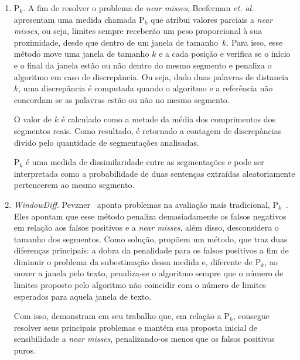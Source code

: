 \begin{enumerate}

	\item P$_k$. A fim de resolver o problema de \textit{near misses}, Beeferman \textit{et. al.}~\cite{Beeferman1999} apresentam uma medida chamada P$_k$ que atribui 
%
valores parciais a \textit{near misses}, 
%
ou seja, limites sempre receberão um peso proporcional à sua proximidade, desde que dentro de um janela de tamanho~$k$.
%
Para isso, esse método move uma janela de tamanho $k$ e a cada posição e verifica se o início e o final da janela estão ou não dentro do mesmo segmento e penaliza o algoritmo em caso de discrepância. Ou seja, dado duas palavras de distancia $k$, uma discrepância é computada quando o algoritmo e a referência não concordam se as palavras estão ou não no mesmo segmento.

O valor de $k$ é calculado como a metade da média dos comprimentos dos segmentos reais. Como resultado, é retornado a contagem de discrepâncias divido pelo quantidade de segmentações analisadas. 

P$_k$ é uma medida de dissimilaridade entre as segmentações e pode ser interpretada como a probabilidade de duas sentenças extraídas aleatoriamente pertencerem ao mesmo segmento.

\item \textit{WindowDiff}. Pevzner~\cite{Pevzner2002} aponta problemas na avaliação mais tradicional, P$_k$~\cite{Beeferman1999}. Eles apontam que esse método penaliza demasiadamente os falsos negativos em relação aos falsos positivos e a \textit{near misses}, além disso, desconsidera o tamanho dos segmentos. Como solução, propõem um método, que traz duas diferenças principais: a dobra da penalidade para os falsos positivos a fim de diminuir o problema da subestimação dessa medida e, diferente de P$_k$, ao mover a janela pelo texto, penaliza-se o algoritmo sempre que o número de limites proposto pelo algoritmo não coincidir com o número de limites esperados para aquela janela de texto. 

Com isso, demonstram em seu trabalho que, em relação a P$_k$, consegue resolver seus principais problemas e mantém sua proposta inicial de sensibilidade a \textit{near misses}, penalizando-os menos que os falsos positivos puros.


\end{enumerate}














